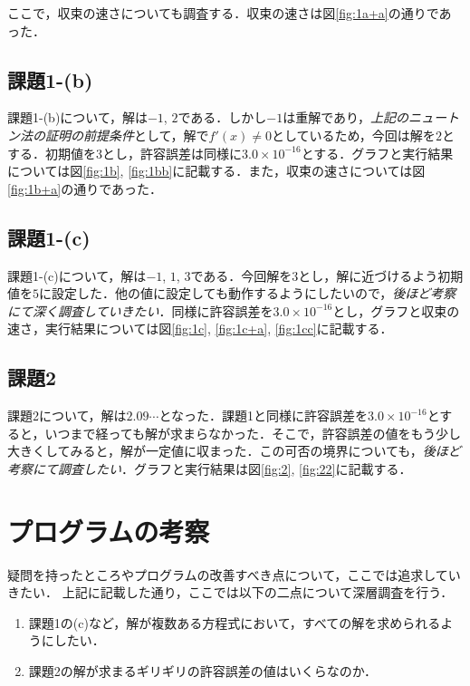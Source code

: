 \documentclass[12pt]{jarticle}
\begin{document}
ここで，収束の速さについても調査する．収束の速さは図\ref{fig:1a+a}の通りであった．

\subsection{課題1-(b)}
課題1-(b)について，解は$-1$, $2$である．しかし$-1$は重解であり，\emph{上記のニュートン法の証明の前提条件}として，解で$f'(x)\neq0$としているため，今回は解を$2$とする．初期値を$3$とし，許容誤差は同様に$3.0 \times 10^{-16}$とする．グラフと実行結果については図\ref{fig:1b}, \ref{fig:1bb}に記載する．また，収束の速さについては図\ref{fig:1b+a}の通りであった．

\subsection{課題1-(c)}
課題1-(c)について，解は$-1$, $1$, $3$である．今回解を$3$とし，解に近づけるよう初期値を$5$に設定した．他の値に設定しても動作するようにしたいので，\emph{後ほど考察にて深く調査していきたい}．同様に許容誤差を$3.0 \times 10^{-16}$とし，グラフと収束の速さ，実行結果については図\ref{fig:1c}, \ref{fig:1c+a}, \ref{fig:1cc}に記載する．

\subsection{課題2}
課題2について，解は$2.09\cdots$となった．課題1と同様に許容誤差を$3.0 \times 10^{-16}$とすると，いつまで経っても解が求まらなかった．そこで，許容誤差の値をもう少し大きくしてみると，解が一定値に収まった．この可否の境界についても，\emph{後ほど考察にて調査したい}．グラフと実行結果は図\ref{fig:2}, \ref{fig:22}に記載する．



\section{プログラムの考察}

疑問を持ったところやプログラムの改善すべき点について，ここでは追求していきたい．
上記に記載した通り，ここでは以下の二点について深層調査を行う．

\begin{enumerate}
\item 課題1の(c)など，解が複数ある方程式において，すべての解を求められるようにしたい．
\item 課題2の解が求まるギリギリの許容誤差の値はいくらなのか．
\end{enumerate}
\end{document}
